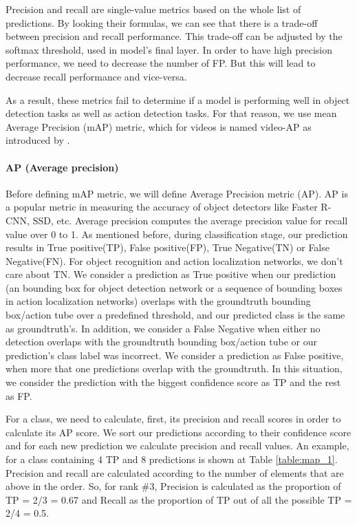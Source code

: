 Precision and recall are single-value metrics based on the whole list of predictions. By looking their formulas, we can see that there is
a trade-off between precision and recall performance. This trade-off can be adjusted by the softmax threshold, used in model's final layer.
In order to have high precision performance, we need to decrease the number of FP. But this will lead to decrease recall performance and
vice-versa. \par
As a result, these metrics fail to determine if a model is performing well in object detection tasks as well as action detection tasks. For
that reason, we use mean Average Precision (mAP) metric, which for videos is named video-AP as introduced by \cite{DBLP:journals/corr/GkioxariM14}.
\paragraph{AP (Average precision)} Before defining mAP metric, we will define Average Precision metric (AP). AP is a popular metric in measuring the accuracy of
object detectors like Faster R-CNN, SSD, etc. Average precision computes the average precision value for recall value over 0 to 1.
As mentioned before, during classification stage, our prediction results in True positive(TP), False positive(FP), True Negative(TN) or False Negative(FN). For object recognition and action
localization networks, we don't care about TN. We consider a prediction as True positive when our prediction (an bounding box for object detection network or a sequence of bounding boxes in
action localization networks) overlaps with the groundtruth bounding box/action tube over a predefined threshold, and our predicted class is the same as groundtruth's. In addition, we
consider a False Negative when either no detection overlaps with the groundtruth bounding box/action tube or our prediction's class label was incorrect. We consider a prediction as False positive, when more that
one predictions overlap with the groundtruth. In this situation, we consider the prediction with the biggest confidence score as TP and the rest as FP.\par

For a class, we need to calculate, first, its precision and recall scores in order to calculate its AP score. We sort our predictions according to their confidence score and for each new prediction we
calculate precision and recall values. An example, for a class containing 4 TP and 8 predictions  is shown at Table \ref{table:map_1}. Precision and recall
are calculated according to the number of elements that are above in the order. So, for rank \#3, Precision is calculated as the proportion of TP = 2/3 = 0.67
and Recall as the proportion of TP out of all the possible TP = 2/4 = 0.5.

